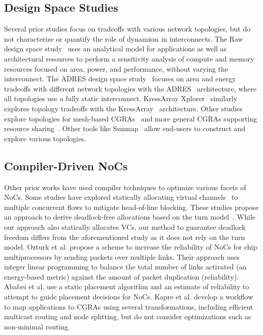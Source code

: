 \subsection{Design Space Studies} Several prior studies focus on tradeoffs with various network topologies, but do not characterize or quantify the role of dynamism in interconnects.
The Raw design space study~\cite{dse-raw} uses an analytical model for applications as well as architectural resources to perform a sensitivity analysis of compute and memory resources focused on area, power, and performance, without varying the interconnect. The ADRES design space study~\cite{dse-adres} focuses on area and energy tradeoffs with different network topologies with the ADRES~\cite{adres} architecture, where all topologies use a fully static interconnect. KressArray Xplorer~\cite{dse-kressarray} similarly explores topology tradeoffs with the KressArray~\cite{kress} architecture. Other studies explore topologies for mesh-based CGRAs~\cite{dse-date} and more general CGRAs supporting resource sharing~\cite{dse-tvlsi}. Other tools like Sunmap~\cite{sunmap} allow end-users to construct and explore various topologies.

\subsection{Compiler-Driven NoCs}
Other prior works have used compiler techniques to optimize various facets of NoCs.
Some studies have explored statically allocating virtual channels~\cite{staticVC-isca, staticVC-nocs} to multiple concurrent flows to mitigate head-of-line blocking. These studies propose an approach to derive deadlock-free allocations based on the turn model~\cite{turnModel}. While our approach also statically allocates VCs, our method to guarantee deadlock freedom differs from the aforementioned study as it does not rely on the turn model.
Ozturk et al. \cite{ozturk2010compiler} propose a scheme to increase the reliability of NoCs for chip multiprocessors by sending packets over multiple links.
Their approach uses integer linear programming to balance the total number of links activated (an energy-based metric) against the amount of packet duplication (reliability).
Ababei et al. \cite{ababei2011energy} use a static placement algorithm and an estimate of reliability to attempt to guide placement decisions for NoCs.
Kapre et al. \cite{kapre2011noc} develop a workflow to map applications to CGRAs using several transformations, including efficient multicast routing and node splitting, but do not consider optimizations such as non-minimal routing.

